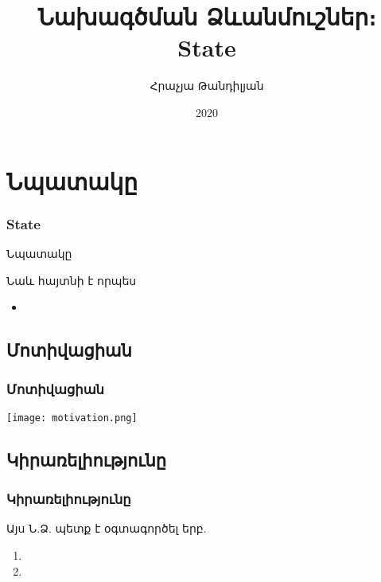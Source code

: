 \documentclass{beamer}
\begin{document}
\title[State]{Նախագծման Ձևանմուշներ։ State}
\author[Հրաչյա Թանդիլյան\copyright]{Հրաչյա Թանդիլյան}
\date{2020}

\begin{frame}
\titlepage
\end{frame}

\section{Նպատակը}
\begin{frame}\frametitle{State}
\begin{block}{Նպատակը}

\end{block}
\vfill
Նաև հայտնի է որպես
\begin{itemize}
    \item 
\end{itemize}
\end{frame}

\subsection{Մոտիվացիան}
\begin{frame}\frametitle{Մոտիվացիան}
\begin{center}
    \texttt{[image: motivation.png]}
\end{center}
\end{frame}

\subsection{Կիրառելիությունը}
\begin{frame}\frametitle{Կիրառելիությունը}
Այս Ն.Ձ. պետք է օգտագործել երբ.
\vfill
\begin{enumerate}
    \item  \pause \vfill
    \item
\end{enumerate}
\end{frame}
\end{document}
